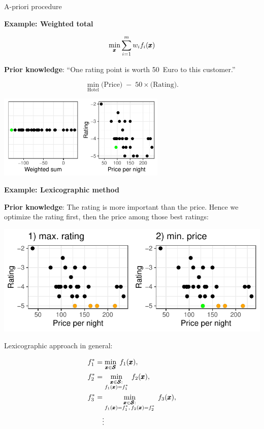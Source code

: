 \documentclass[11pt,compress,t,notes=noshow,xcolor=table]{beamer}
\newcommand{\yy}{\cost}    %
\begin{document}
\begin{vbframe}{A-priori procedure}

\textbf{Example: Weighted total}

$$ \min_{\pmb{x}} \sum_{i=1}^m w_i f_i(\pmb{x}) $$

\textbf{Prior knowledge}: 
``One rating point is worth 50~Euro to this customer.'' 

\[
\min_{\text{Hotel}} \text{(Price)} \;-\; 50 \times \text{(Rating)}.
\]
\vspace{-0.2cm}
\begin{center}
\includegraphics[width=0.6\textwidth]{slides/11-multicrit/figure_man/expedia-9-1.pdf}
\end{center}


\framebreak

\textbf{Example: Lexicographic method}

\textbf{Prior knowledge}: The rating is more important than the price. 
Hence we optimize the rating first, then the price among those best ratings:

\begin{center}
\includegraphics[width=1\textwidth]{slides/11-multicrit/figure_man/expedia-10-1.pdf}
\end{center}

\framebreak
\vspace{-0.3cm}
Lexicographic approach in general:

{\small
\[
\begin{aligned}
\yy_1^* &= \min_{\conf \in \pcs} \;\cost_1(\conf),\\
\yy_2^* &= \min_{\substack{\conf \in \pcs:\\ \cost_1(\conf)=\yy_1^*}} \;\cost_2(\conf),\\
\yy_3^* &= \min_{\substack{\conf \in \pcs:\\ \cost_1(\conf)=\yy_1^*,\,\cost_2(\conf)=\yy_2^*}} 
          \;\cost_3(\conf),\\
&\quad\vdots
\end{aligned}
\]
}


\end{vbframe}
\end{document}
